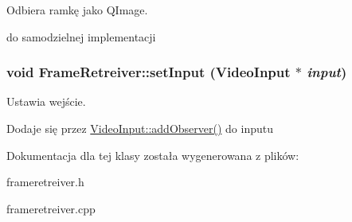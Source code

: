 Odbiera ramkę jako QImage. 

do samodzielnej implementacji \hypertarget{class_frame_retreiver_8d7772f0a3d6373f5a54bf4fcc042ccc}{
\subsubsection[{setInput}]{\setlength{\rightskip}{0pt plus 5cm}void FrameRetreiver::setInput ({\bf VideoInput} $\ast$ {\em input})}}
\label{class_frame_retreiver_8d7772f0a3d6373f5a54bf4fcc042ccc}


Ustawia wejście. 

Dodaje się przez \hyperlink{class_video_input_c2370a0c1ea0d4b1ce36c2f9678530a4}{VideoInput::addObserver()} do inputu 

Dokumentacja dla tej klasy została wygenerowana z plików:\begin{CompactItemize}
\item 
frameretreiver.h\item 
frameretreiver.cpp\end{CompactItemize}
